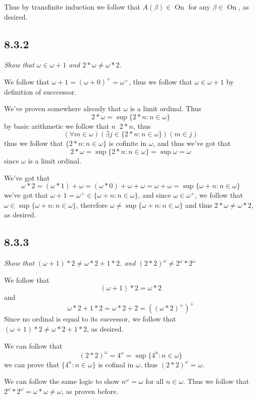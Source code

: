 \documentclass[11pt,oneside,titlepage]{book}
\DeclareMathOperator \On {On}
\DeclareMathOperator \ineq {\underline{\in}}
\newcommand{\set}[1]{\{ #1 \}}
\begin{document}
Thus by transfinite induction we follow that $A(\beta) \in \On$ for any $\beta \in \On$,
as desired.

\subsection*{8.3.2}

\textit{Show that $\omega \in \omega + 1$ and $2 * \omega \neq \omega * 2$.}

We follow that $\omega + 1 = (\omega + 0)^+ = \omega^+$, thus
we follow that $\omega \in \omega + 1$ by definition of succcessor.

We've proven somewhere already that $\omega$ is a limit ordinal. Thus
$$ 2 * \omega = \sup\set{2 * n: n \in \omega}$$
by basic arithmetic we follow that $n \ineq 2 * n$, thus
$$(\forall m \in \omega)(\exists j \in \set{2 * n: n \in \omega})(m \in j)$$
thus we follow that $\set{2 * n: n \in \omega}$ is cofinite in $\omega$, and thus
we've got that
$$2 * \omega = \sup\set{2 * n: n \in \omega} = \sup \omega = \omega$$
since $\omega$ is a limit ordinal.

We've got that
$$\omega * 2 = (\omega * 1) + \omega = (\omega * 0) + \omega + \omega = \omega + \omega =
\sup\set{\omega + n: n \in \omega}$$
we've got that $\omega + 1 = \omega^+ \in \set{\omega + n: n \in \omega}$,
and since $\omega \in \omega^+$, we follow that $\omega \in \sup\set{\omega + n: n \in \omega}$,
therefore $\omega \neq \sup\set{\omega + n: n \in \omega}$ and
thus $2 * \omega \neq \omega * 2$, as desired.

\subsection*{8.3.3}

\textit{Show that $(\omega + 1) * 2 \neq \omega * 2 + 1 * 2$. and
  $(2 * 2)^\omega \neq 2^\omega * 2^\omega$}

We follow that
$$(\omega + 1) * 2 = \omega * 2$$
and
$$\omega * 2 + 1 * 2 = \omega * 2 + 2 = ((\omega * 2)^+)^+$$
Since no ordinal is equal to its successor, we follow that
$(\omega + 1) * 2 \neq \omega * 2 + 1 * 2$, as desired.

We can follow that
$$(2 * 2)^\omega = 4^\omega = \sup\set{4^n: n \in \omega}$$
we can prove that $\set{4^n: n \in \omega}$ is cofinal in $\omega$, thus
$(2 * 2)^\omega = \omega$.

We can follow the same logic to show $n^\omega = \omega$ for all $n \in \omega$.
Thus we follow that $2^\omega * 2^\omega = \omega * \omega \neq \omega$, as proven
before.
\end{document}
